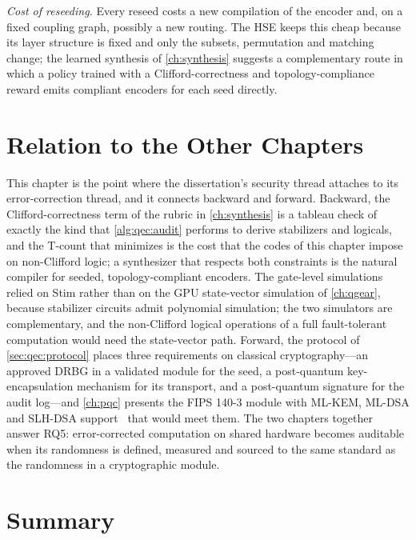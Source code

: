 \emph{Cost of reseeding.} Every reseed costs a new compilation of the encoder and, on a fixed coupling graph, possibly a new routing. The HSE keeps this cheap because its layer structure is fixed and only the subsets, permutation and matching change; the learned synthesis of \cref{ch:synthesis} suggests a complementary route in which a policy trained with a Clifford-correctness and topology-compliance reward emits compliant encoders for each seed directly.

\section{Relation to the Other Chapters}\label{sec:qec:relation}

This chapter is the point where the dissertation's security thread attaches to its error-correction thread, and it connects backward and forward. Backward, the Clifford-correctness term of the \rubriq{} rubric in \cref{ch:synthesis} is a tableau check of exactly the kind that \cref{alg:qec:audit} performs to derive stabilizers and logicals, and the T-count that \rubriq{} minimizes is the cost that the codes of this chapter impose on non-Clifford logic; a synthesizer that respects both constraints is the natural compiler for seeded, topology-compliant encoders. The gate-level simulations relied on Stim rather than on the GPU state-vector simulation of \cref{ch:qgear}, because stabilizer circuits admit polynomial simulation; the two simulators are complementary, and the non-Clifford logical operations of a full fault-tolerant computation would need the state-vector path. Forward, the protocol of \cref{sec:qec:protocol} places three requirements on classical cryptography---an approved DRBG in a validated module for the seed, a post-quantum key-encapsulation mechanism for its transport, and a post-quantum signature for the audit log---and \cref{ch:pqc} presents the FIPS 140-3 module with ML-KEM, ML-DSA and SLH-DSA support~\cite{guo2026lightriderqpc} that would meet them. The two chapters together answer RQ5: error-corrected computation on shared hardware becomes auditable when its randomness is defined, measured and sourced to the same standard as the randomness in a cryptographic module.

\section{Summary}\label{sec:qec:summary}

